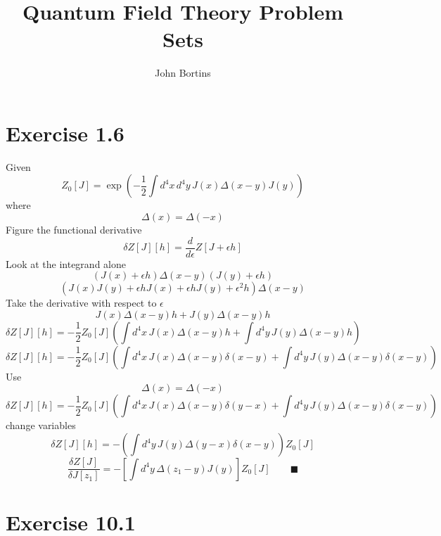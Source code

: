 \documentclass{amsart}
\title{Quantum Field Theory Problem Sets}
\author{John Bortins}
\begin{document}
\maketitle{}



\section*{Exercise 1.6}
Given \[Z_0[J]=\exp\left(-\frac{1}{2}\int d^4 x\, d^4 y\, J(x) \Delta(x-y) J(y)\right)\]
where \[\Delta(x)=\Delta(-x)\]
Figure the functional derivative
\[\delta Z[J][h]=\frac{d}{d\epsilon}Z[J+\epsilon h]\]
Look at the integrand alone
\[(J(x)+\epsilon h) \Delta(x-y) (J(y)+\epsilon h)\]
\[(J(x)J(y)+\epsilon h J(x)+\epsilon h J(y)+\epsilon^2 h) \Delta(x-y)\]
Take the derivative with respect to $\epsilon$
\[J(x) \Delta(x-y)h + J(y) \Delta(x-y)h\]
\[\delta Z[J][h]=-\frac{1}{2}Z_0[J]\left(\int d^4 x\,  J(x) \Delta(x-y)h +\int d^4 y\,J(y) \Delta(x-y)h\right)\]
\[\delta Z[J][h]=-\frac{1}{2}Z_0[J]\left(\int d^4 x\,  J(x) \Delta(x-y)\delta(x-y) +\int d^4 y\,J(y) \Delta(x-y)\delta(x-y)\right)\]
Use \[\Delta(x)=\Delta(-x)\]
\[\delta Z[J][h]=-\frac{1}{2}Z_0[J]\left(\int d^4 x\,  J(x) \Delta(x-y)\delta(y-x) +\int d^4 y\,J(y) \Delta(x-y)\delta(x-y)\right)\] change variables
\[\delta Z[J][h]=-\left(\int d^4 y\,J(y) \Delta(y-x)\delta(x-y)\right)Z_0[J]\]
\[\frac{\delta Z[J]}{\delta J[z_1]}=-\left[\int d^4 y\, \Delta(z_1-y)J(y)\right]Z_0[J] \qquad \blacksquare\]

\section*{Exercise 10.1}
\end{document}
